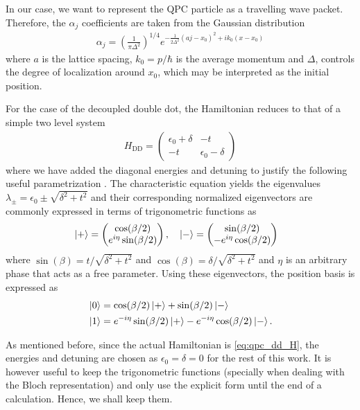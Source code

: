 \documentclass{article}
\begin{document}
In our case, we want to represent the QPC particle as a travelling wave packet. Therefore, the $\alpha_j$
coefficients are taken from the Gaussian distribution
\begin{align}\label{eq:gaussian_distribution}
    \alpha_{j}=\left(\frac{1}{\pi \Delta^2}\right)^{1/4}e^{-\frac{1}{2\Delta^2}(aj-x_{0})^2 + i k_0 (x-x_0)}
\end{align}
where $a$ is the lattice spacing, $k_0 = p/\hbar$ is the average momentum and $\Delta$, 
controls the degree of localization 
around $x_0$, which
may be interpreted as the initial position.

For the case of the decoupled double dot, the Hamiltonian reduces to that of a simple two level system 
\begin{align}
    H_{\text{DD}} = \begin{pmatrix}
        \epsilon_0 + \delta & -t \\
        -t & \epsilon_0 - \delta 
    \end{pmatrix}
\end{align}
where we have added the diagonal energies and detuning to justify the following useful parametrization . 
The characteristic equation yields the eigenvalues $\lambda_{\pm} = \epsilon_0 \pm \sqrt{\delta^2 + t^2}$
and their corresponding normalized eigenvectors are commonly expressed in terms of trigonometric 
functions as
\begin{align}
    & \ket{+} = \begin{pmatrix}
      \cos(\beta/2) \\
        e^{i\eta} \sin(\beta/2) 
    \end{pmatrix} , \quad \ket{-} = \begin{pmatrix}
        \sin(\beta/2) \\
          -e^{i\eta} \cos(\beta/2)
      \end{pmatrix} 
\end{align}
where $\sin(\beta) = t /\sqrt{\delta^2+t^2 }$ and $\cos(\beta) = \delta /\sqrt{\delta^2+t^2}$ and 
$\eta$ is an arbitrary phase that acts as a free parameter. Using these eigenvectors, the position 
basis is expressed as
\begin{align}
    & \ket{0} = \cos (\beta/2) \ket{+} + \sin(\beta/2) \ket{-} \\
    & \ket{1} = e^{-i \eta} \sin (\beta/2) \ket{+} - e^{-i \eta}\cos(\beta/2) \ket{-}. 
\end{align}

As mentioned before, since the actual Hamiltonian is \eqref{eq:qpc_dd_H}, the energies and detuning are 
chosen as $\epsilon_0 = \delta = 0$ for the rest of this work. It is however useful to keep the 
trigonometric functions (specially when dealing with the Bloch representation)
and only use the explicit form until the end of a calculation. Hence, we shall keep them.
\end{document}
